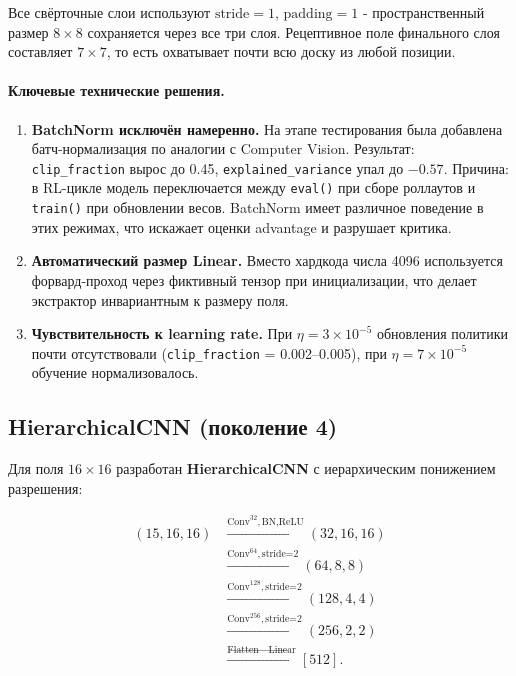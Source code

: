 \documentclass[12pt, a4paper]{article}
\begin{document}
Все свёрточные слои используют $\mathrm{stride}=1$, $\mathrm{padding}=1$ - пространственный размер $8\times 8$ сохраняется через все три слоя. Рецептивное поле финального слоя составляет $7\times 7$, то есть охватывает почти всю доску из любой позиции.

\paragraph{Ключевые технические решения.}
\begin{enumerate}
  \item \textbf{BatchNorm исключён намеренно.} На этапе тестирования была добавлена батч-нормализация по аналогии с Computer Vision. Результат: \texttt{clip\_fraction} вырос до 0.45, \texttt{explained\_variance} упал до $-0.57$. Причина: в RL-цикле модель переключается между \texttt{eval()} при сборе роллаутов и \texttt{train()} при обновлении весов. BatchNorm имеет различное поведение в этих режимах, что искажает оценки advantage и разрушает критика.
  \item \textbf{Автоматический размер Linear.} Вместо хардкода числа 4096 используется форвард-проход через фиктивный тензор при инициализации, что делает экстрактор инвариантным к размеру поля.
  \item \textbf{Чувствительность к learning rate.} При $\eta = 3\times 10^{-5}$ обновления политики почти отсутствовали (\texttt{clip\_fraction} = 0.002--0.005), при $\eta = 7\times 10^{-5}$ обучение нормализовалось.
\end{enumerate}

\subsection{HierarchicalCNN (поколение 4)}

Для поля $16\times16$ разработан \textbf{HierarchicalCNN} с иерархическим понижением разрешения:

\begin{equation}
	\begin{aligned}
		(15,16,16)
		&\xrightarrow{\text{Conv}^{32},\text{BN,ReLU}} (32,16,16) \\
		&\xrightarrow{\text{Conv}^{64},\text{stride=2}} (64,8,8) \\
		&\xrightarrow{\text{Conv}^{128},\text{stride=2}} (128,4,4) \\
		&\xrightarrow{\text{Conv}^{256},\text{stride=2}} (256,2,2) \\
		&\xrightarrow{\text{Flatten}\to\text{Linear}} [512].
	\end{aligned}
\end{equation}
\end{document}
